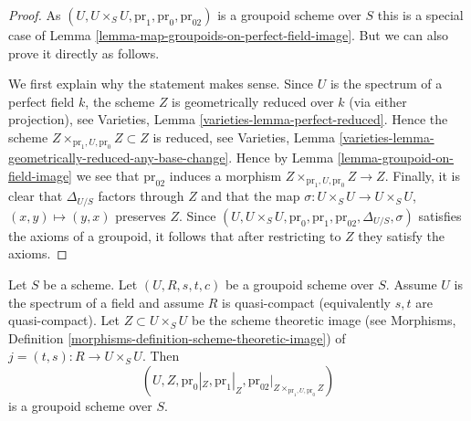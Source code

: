 \begin{proof}
As $(U, U \times_S U, \text{pr}_1, \text{pr}_0, \text{pr}_{02})$
is a groupoid scheme over $S$ this is a special case of
Lemma \ref{lemma-map-groupoids-on-perfect-field-image}.
But we can also prove it directly as follows.

\medskip\noindent
We first explain why the statement makes sense. Since $U$ is the spectrum
of a perfect field $k$, the scheme $Z$ is geometrically reduced
over $k$ (via either projection), see
Varieties, Lemma \ref{varieties-lemma-perfect-reduced}.
Hence the scheme $Z \times_{\text{pr}_1, U, \text{pr}_0} Z \subset Z$
is reduced, see
Varieties, Lemma \ref{varieties-lemma-geometrically-reduced-any-base-change}.
Hence by
Lemma \ref{lemma-groupoid-on-field-image}
we see that $\text{pr}_{02}$ induces a morphism
$Z \times_{\text{pr}_1, U, \text{pr}_0} Z \to Z$.
Finally, it is clear that $\Delta_{U/S}$ factors through $Z$
and that the map
$\sigma : U \times_S U \to U \times_S U$, $(x, y) \mapsto (y, x)$
preserves $Z$. Since
$(U, U \times_S U, \text{pr}_0, \text{pr}_1, \text{pr}_{02},
\Delta_{U/S}, \sigma)$
satisfies the axioms of a groupoid, it follows that after restricting
to $Z$ they satisfy the axioms.
\end{proof}

\begin{lemma}
\label{lemma-quasi-compact-groupoid-on-field-image}
Let $S$ be a scheme. Let $(U, R, s, t, c)$ be a groupoid scheme
over $S$. Assume $U$ is the spectrum of a field and
assume $R$ is quasi-compact (equivalently $s, t$ are quasi-compact).
Let $Z \subset U \times_S U$ be the scheme theoretic image (see
Morphisms, Definition \ref{morphisms-definition-scheme-theoretic-image})
of $j = (t, s) : R \to U \times_S U$.
Then
$$
(U, Z, \text{pr}_0|_Z, \text{pr}_1|_Z,
\text{pr}_{02}|_{Z \times_{\text{pr}_1, U, \text{pr}_0} Z})
$$
is a groupoid scheme over $S$.
\end{lemma}

